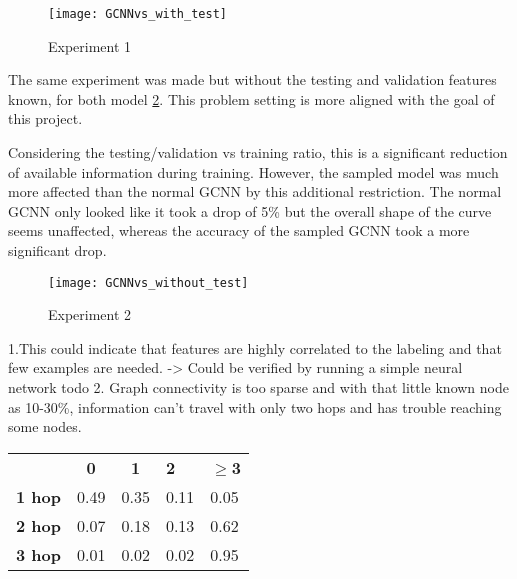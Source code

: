 \documentclass{article}
\begin{document}
\begin{figure}[h]
\centering
\texttt{[image: GCNNvs\_with\_test]}
\caption{
Experiment 1
}
\label{with_test_balanced}
\end{figure}

The same experiment %
 was made but without the testing and validation features known, for both model \ref{without_test_balanced}. %
 This problem setting is more aligned with the goal of this project.

Considering the testing/validation vs training ratio, this is a significant reduction of available information during training. However, the sampled model was much more affected than the normal GCNN by this additional restriction. The normal GCNN only %
looked like it took a drop of 5\% but the overall shape of the curve seems unaffected, whereas the accuracy of the sampled GCNN took a more significant drop.

\begin{figure}[h]
\centering
\texttt{[image: GCNNvs\_without\_test]}
\caption{
Experiment 2
}
\label{without_test_balanced}
\end{figure}


1.This could indicate that features are highly correlated to the labeling and that few examples are needed. -> Could be verified by running a simple neural network todo
2. Graph connectivity is too sparse and with that little known node as 10-30\%, information can't travel with only two hops and has trouble reaching some nodes. 

\begin{table}[]
\begin{tabular}{cc|cll}
\textbf{}                          & \textbf{0}                & \textbf{1}               & \textbf{2} & \textbf{$\geq$3} \\ \cline{2-5} 
\textbf{1 hop}                     & 0.49                      & 0.35                     & 0.11       & 0.05                      \\
\textbf{2 hop}                     & 0.07                      & 0.18                     & 0.13       & 0.62                      \\
\multicolumn{1}{l}{\textbf{3 hop}} & \multicolumn{1}{l|}{0.01} & \multicolumn{1}{l}{0.02} & 0.02       & 0.95                     
\end{tabular}
\end{table}
               
\end{document}
